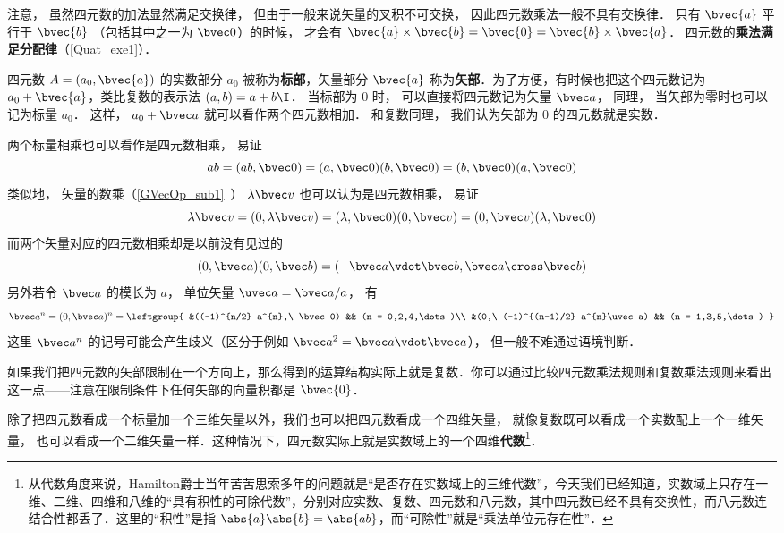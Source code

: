 注意， 虽然四元数的加法显然满足交换律， 但由于一般来说矢量的叉积不可交换， 因此四元数乘法一般不具有交换律． 只有 $\bvec{a}$ 平行于 $\bvec{b}$ （包括其中之一为 $\bvec 0$）的时候， 才会有 $\bvec{a}\times\bvec{b}= \bvec{0} =\bvec{b}\times\bvec{a}$． 四元数的\textbf{乘法满足分配律}（\autoref{Quat_exe1}）．

四元数 $A=(a_0, \bvec{a})$ 的实数部分 $a_0$ 被称为\textbf{标部}，矢量部分 $\bvec{a}$ 称为\textbf{矢部}．为了方便，有时候也把这个四元数记为 $a_0+\bvec{a}$，类比复数的表示法 $(a, b)=a+b\I$． 当标部为 $0$ 时， 可以直接将四元数记为矢量 $\bvec a$， 同理， 当矢部为零时也可以记为标量 $a_0$． 这样， $a_0 + \bvec a$ 就可以看作两个四元数相加． 和复数同理， 我们认为矢部为 $0$ 的四元数就是实数．

两个标量相乘也可以看作是四元数相乘， 易证
\begin{equation}
ab = (ab, \bvec 0) = (a,\bvec 0)(b,\bvec 0) = (b,\bvec 0)(a,\bvec 0)
\end{equation}
类似地， 矢量的数乘（\autoref{GVecOp_sub1}~） $\lambda\bvec v$ 也可以认为是四元数相乘， 易证
\begin{equation}
\lambda\bvec v = (0, \lambda\bvec v) = (\lambda, \bvec 0)(0, \bvec v) = (0, \bvec v)(\lambda, \bvec 0)
\end{equation}
而两个矢量对应的四元数相乘却是以前没有见过的
\begin{equation}
(0, \bvec a)(0, \bvec b) = (-\bvec a\vdot\bvec b, \bvec a\cross\bvec b)
\end{equation}
另外若令 $\bvec a$ 的模长为 $a$， 单位矢量 $\uvec a = \bvec a/a$， 有
\begin{equation}
\bvec a^{n} = (0, \bvec a)^{n} =
\leftgroup{
&((-1)^{n/2} a^{n},\  \bvec 0) && (n = 0,2,4,\dots)\\
&(0,\ (-1)^{(n-1)/2} a^{n}\uvec a) && (n = 1,3,5,\dots)
}
\end{equation}
这里 $\bvec a^{n}$ 的记号可能会产生歧义（区分于例如 $\bvec a^2 = \bvec a\vdot\bvec a$）， 但一般不难通过语境判断．

如果我们把四元数的矢部限制在一个方向上，那么得到的运算结构实际上就是复数．你可以通过比较四元数乘法规则和复数乘法规则来看出这一点——注意在限制条件下任何矢部的向量积都是 $\bvec{0}$．

除了把四元数看成一个标量加一个三维矢量以外，我们也可以把四元数看成一个四维矢量， 就像复数既可以看成一个实数配上一个一维矢量， 也可以看成一个二维矢量一样．这种情况下，四元数实际上就是实数域上的一个四维\textbf{代数}\footnote{从代数角度来说，Hamilton爵士当年苦苦思索多年的问题就是“是否存在实数域上的三维代数”，今天我们已经知道，实数域上只存在一维、二维、四维和八维的“具有积性的可除代数”，分别对应实数、复数、四元数和八元数，其中四元数已经不具有交换性，而八元数连结合性都丢了．这里的“积性”是指 $\abs{a}\abs{b}=\abs{ab}$，而“可除性”就是“乘法单位元存在性”．}．

